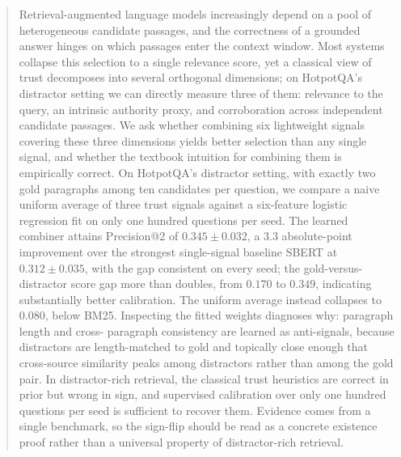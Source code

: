 \begin{abstract}
Retrieval-augmented language models increasingly depend on a pool of
heterogeneous candidate passages, and the correctness of a grounded
answer hinges on which passages enter the context window. Most
systems collapse this selection to a single relevance score, yet a
classical view of trust decomposes into several orthogonal
dimensions; on HotpotQA's distractor setting we can directly
measure three of them: relevance to the query, an intrinsic
authority proxy, and corroboration across independent candidate
passages. We ask whether combining six lightweight signals covering
these three dimensions yields better selection than any single
signal, and whether the textbook intuition for combining them is
empirically correct. On HotpotQA's distractor setting, with exactly two gold
paragraphs among ten candidates per question, we compare a naive
uniform average of three trust signals against a six-feature
logistic regression fit on only one hundred questions per seed. The
learned combiner attains Precision@2 of $0.345 \pm 0.032$, a 3.3
absolute-point improvement over the strongest single-signal baseline
SBERT at $0.312 \pm 0.035$, with the gap consistent on every seed;
the gold-versus-distractor score gap more than doubles, from
$0.170$ to $0.349$, indicating substantially better calibration. The
uniform average instead collapses to $0.080$, below BM25. Inspecting
the fitted weights diagnoses why: paragraph length and cross-
paragraph consistency are learned as anti-signals, because
distractors are length-matched to gold and topically close enough
that cross-source similarity peaks among distractors rather than
among the gold pair. In distractor-rich retrieval, the classical
trust heuristics are correct in prior but wrong in sign, and
supervised calibration over only one hundred questions per seed is
sufficient to recover them. Evidence comes from a single benchmark,
so the sign-flip should be read as a concrete existence proof rather
than a universal property of distractor-rich retrieval.
\end{abstract}

